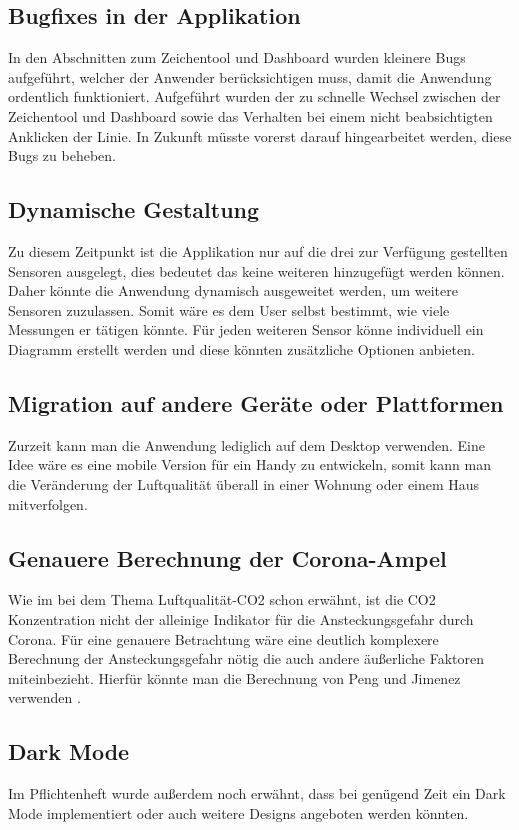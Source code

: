 \documentclass[]{article}
\begin{document}
		\subsection{Bugfixes in der Applikation}
			In den Abschnitten zum Zeichentool und Dashboard wurden kleinere Bugs aufgeführt, welcher der Anwender berücksichtigen muss, damit die Anwendung ordentlich funktioniert. Aufgeführt wurden der zu schnelle Wechsel zwischen der Zeichentool und Dashboard sowie das Verhalten bei einem nicht beabsichtigten Anklicken der Linie. In Zukunft müsste vorerst darauf hingearbeitet werden, diese Bugs zu beheben. 
			
		\subsection{Dynamische Gestaltung}
			Zu diesem Zeitpunkt ist die Applikation nur auf die drei zur Verfügung gestellten Sensoren ausgelegt, dies bedeutet das keine weiteren hinzugefügt werden können. Daher könnte die Anwendung dynamisch ausgeweitet werden, um weitere Sensoren zuzulassen. Somit wäre es dem User selbst bestimmt, wie viele Messungen er tätigen könnte. Für jeden weiteren Sensor könne individuell ein Diagramm erstellt werden und diese könnten zusätzliche Optionen anbieten. 
					
		\subsection{Migration auf andere Geräte oder Plattformen}
			Zurzeit kann man die Anwendung lediglich auf dem Desktop verwenden. Eine Idee wäre es eine mobile Version für ein Handy zu entwickeln, somit kann man die Veränderung der Luftqualität überall in einer Wohnung oder einem Haus mitverfolgen. 
		\subsection{Genauere Berechnung der Corona-Ampel}
			Wie im bei dem Thema Luftqualität-CO2 schon erwähnt, ist die CO2 Konzentration nicht der alleinige Indikator für die Ansteckungsgefahr durch Corona. Für eine genauere Betrachtung wäre eine deutlich komplexere Berechnung der Ansteckungsgefahr nötig die auch andere äußerliche Faktoren miteinbezieht. Hierfür könnte man die Berechnung von Peng und Jimenez verwenden \cite{luftquali_co2_corona}.
		\subsection{Dark Mode}
			Im Pflichtenheft wurde außerdem noch erwähnt, dass bei genügend Zeit ein Dark Mode implementiert oder auch weitere Designs angeboten werden könnten. 	
		
		
\newpage
\printbibliography
\end{document}
